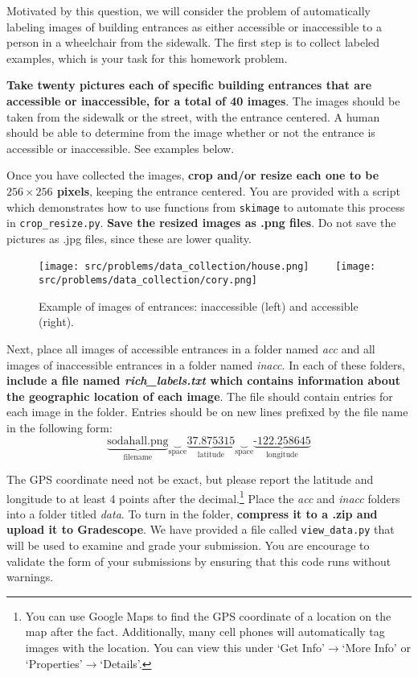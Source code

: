 \documentclass[preview]{standalone}
\begin{document}
Motivated by this question, we will consider the problem of automatically labeling images of building entrances as either accessible or inaccessible to a person in a wheelchair from the sidewalk. The first step is to collect labeled examples, which is your task for this homework problem.


{\bf Take twenty pictures each of specific building entrances that are accessible or inaccessible, for a total of 40 images}.
The images should be taken from the sidewalk or the street, with the entrance centered. A human should be able to determine from the image whether or not the entrance is accessible or inaccessible. See examples below. 

Once you have collected the images, {\bf crop and/or resize each one to be $256\times256$ pixels}, keeping the entrance centered. You are provided with a script which demonstrates how to use functions from \texttt{skimage} to automate this process in \texttt{crop\_resize.py}. 
{\bf Save the resized images as .png files}. Do not save the pictures as .jpg files, since these are lower quality.

\begin{figure}[h!]
    \begin{center}
    \texttt{[image: src/problems/data\_collection/house.png]}$\qquad$
    \texttt{[image: src/problems/data\_collection/cory.png]}
    \caption{Example of images of entrances: inaccessible (left) and accessible (right).} \label{fig:robot}
    \end{center}
\end{figure}

Next, place all images of accessible entrances in a folder named \emph{acc} and all images of inaccessible entrances in a folder named \emph{inacc}. 
In each of these folders, 
{\bf include a file named \emph{rich\_labels.txt} which contains information about the geographic location of each image}.
The file should contain entries for each image in the folder. Entries should be
on new lines prefixed by the file name in the following form:
\[\underbrace{\textrm{sodahall.png}}_{\textrm{filename}}
\underbrace{\textrm{ }}_{\textrm{space}}
\underbrace{\textrm{37.875315}}_{\textrm{latitude}}
\underbrace{\textrm{ }}_{\textrm{space}}
\underbrace{\textrm{-122.258645}}_{\textrm{longitude}}
\]

The GPS coordinate need not be exact, but please report the latitude and longitude to at least 4 points after the decimal.\footnote{
	You can use Google Maps to find the GPS coordinate of a location on the map after the fact. Additionally, many cell phones will automatically tag images with the location. You can view this under `Get Info'$\to$`More Info' or `Properties'$\to$`Details'.
}
Place the \emph{acc} and \emph{inacc} folders into a folder titled \emph{data}. To turn in the folder, {\bf compress it to a .zip and upload it to Gradescope}.
We have provided a file called \texttt{view\_data.py} that will be used to examine and grade your submission. You are encourage to validate the form of your submissions by ensuring that this code runs without warnings.
\end{document}
